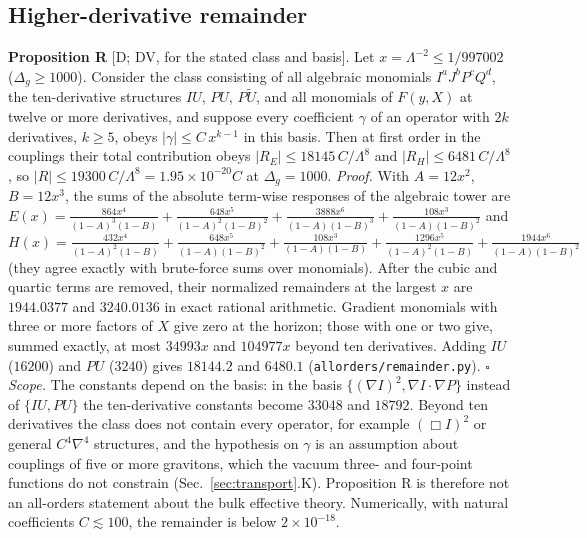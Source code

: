 \subsection{Higher-derivative remainder}
\textbf{Proposition R} [D; DV, for the stated class and basis]. Let $x=\Lambda^{-2}\le1/997002$ ($\Delta_g\ge1000$). Consider the
class consisting of all algebraic monomials $I^aJ^bP^cQ^d$, the ten-derivative structures $IU$, $PU$, $P\tilde U$, and all monomials
of $F(y,X)$ at twelve or more derivatives, and suppose every coefficient $\gamma$ of an operator with $2k$ derivatives, $k\ge5$,
obeys $|\gamma|\le C\,x^{k-1}$ in this basis. Then at first order in the couplings their total contribution obeys
$|R_E|\le18145\,C/\Lambda^8$ and $|R_H|\le6481\,C/\Lambda^8$, so $|R|\le19300\,C/\Lambda^8=1.95\times10^{-20}C$ at $\Delta_g=1000$.
\emph{Proof.} With $A=12x^2$, $B=12x^3$, the sums of the absolute term-wise responses of the algebraic tower are
$E(x)=\frac{864x^4}{(1-A)^3(1-B)}+\frac{648x^5}{(1-A)^2(1-B)^2}+\frac{3888x^6}{(1-A)(1-B)^3}+\frac{108x^3}{(1-A)(1-B)^2}$ and
$H(x)=\frac{432x^4}{(1-A)^2(1-B)}+\frac{648x^5}{(1-A)(1-B)^2}+\frac{108x^3}{(1-A)(1-B)}+\frac{1296x^5}{(1-A)^2(1-B)}+\frac{1944x^6}{(1-A)(1-B)^2}$
(they agree exactly with brute-force sums over monomials). After the cubic and quartic terms are removed, their normalized
remainders at the largest $x$ are $1944.0377$ and $3240.0136$ in exact rational arithmetic. Gradient monomials with three or
more factors of $X$ give zero at the horizon; those with one or two give, summed exactly, at most $34993x$ and $104977x$ beyond
ten derivatives. Adding $IU$ ($16200$) and $PU$ ($3240$) gives $18144.2$ and $6480.1$ (\texttt{allorders/remainder.py}). $\square$\\
\emph{Scope.} The constants depend on the basis: in the basis $\{(\nabla I)^2,\nabla I\cdot\nabla P\}$ instead of $\{IU,PU\}$ the
ten-derivative constants become $33048$ and $18792$. Beyond ten derivatives the class does not contain every operator, for example
$(\Box I)^2$ or general $C^4\nabla^4$ structures, and the hypothesis on $\gamma$ is an assumption about couplings of five or more
gravitons, which the vacuum three- and four-point functions do not constrain (Sec.~\ref{sec:transport}.K). Proposition R is
therefore not an all-orders statement about the bulk effective theory. Numerically, with natural coefficients
$C\lesssim100$, the remainder is below $2\times10^{-18}$.

